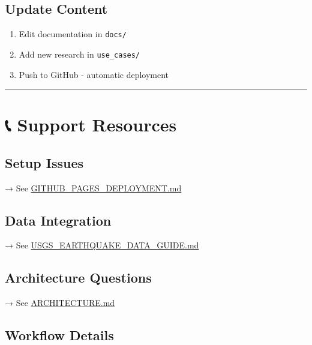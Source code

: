 \documentclass[
  11pt,
  oneside,
  openany]{scrbook}
\providecommand{\tightlist}{%
  \setlength{\itemsep}{0pt}\setlength{\parskip}{0pt}}\usepackage{longtable,booktabs,array}
\begin{document}
\section{\texorpdfstring{\textbf{Update
Content}}{Update Content}}\label{update-content}

\begin{enumerate}
\def\labelenumi{\arabic{enumi}.}
\tightlist
\item
  Edit documentation in \texttt{docs/}
\item
  Add new research in \texttt{use\_cases/}
\item
  Push to GitHub - automatic deployment
\end{enumerate}

\begin{center}\rule{0.5\linewidth}{0.5pt}\end{center}

\chapter{📞 Support Resources}\label{support-resources}

\section{\texorpdfstring{\textbf{Setup
Issues}}{Setup Issues}}\label{setup-issues}

→ See \url{GITHUB_PAGES_DEPLOYMENT.md}

\section{\texorpdfstring{\textbf{Data
Integration}}{Data Integration}}\label{data-integration}

→ See \url{USGS_EARTHQUAKE_DATA_GUIDE.md}

\section{\texorpdfstring{\textbf{Architecture
Questions}}{Architecture Questions}}\label{architecture-questions}

→ See \url{ARCHITECTURE.md}

\section{\texorpdfstring{\textbf{Workflow
Details}}{Workflow Details}}\label{workflow-details}
\end{document}
